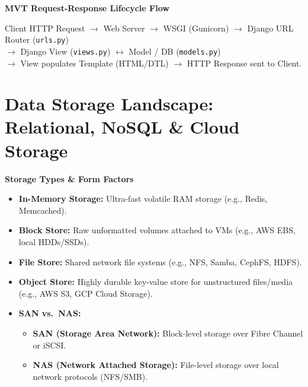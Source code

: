 ﻿\documentclass[8pt, a4paper]{article}
\begin{document}
\begin{conceptbox}
\textbf{MVT Request-Response Lifecycle Flow}

\medskip
Client HTTP Request $\to$ Web Server $\to$ WSGI (Gunicorn) $\to$ Django URL Router (\texttt{urls.py})\\
\hspace*{1.5em}$\to$ Django View (\texttt{views.py}) $\leftrightarrow$ Model / DB (\texttt{models.py})\\
\hspace*{1.5em}$\to$ View populates Template (HTML/DTL) $\to$ HTTP Response sent to Client.
\end{conceptbox}

\section{Data Storage Landscape: Relational, NoSQL \& Cloud Storage}

\begin{conceptbox}
\textbf{Storage Types \& Form Factors}
\begin{itemize}
  \item \textbf{In-Memory Storage:} Ultra-fast volatile RAM storage (e.g., Redis, Memcached).
  \item \textbf{Block Store:} Raw unformatted volumes attached to VMs (e.g., AWS EBS, local HDDs/SSDs).
  \item \textbf{File Store:} Shared network file systems (e.g., NFS, Samba, CephFS, HDFS).
  \item \textbf{Object Store:} Highly durable key-value store for unstructured files/media (e.g., AWS S3, GCP Cloud Storage).
  \item \textbf{SAN vs.\ NAS:}
  \begin{itemize}
    \item \textbf{SAN (Storage Area Network):} Block-level storage over Fibre Channel or iSCSI.
    \item \textbf{NAS (Network Attached Storage):} File-level storage over local network protocols (NFS/SMB).
  \end{itemize}
\end{itemize}
\end{conceptbox}
\end{document}

